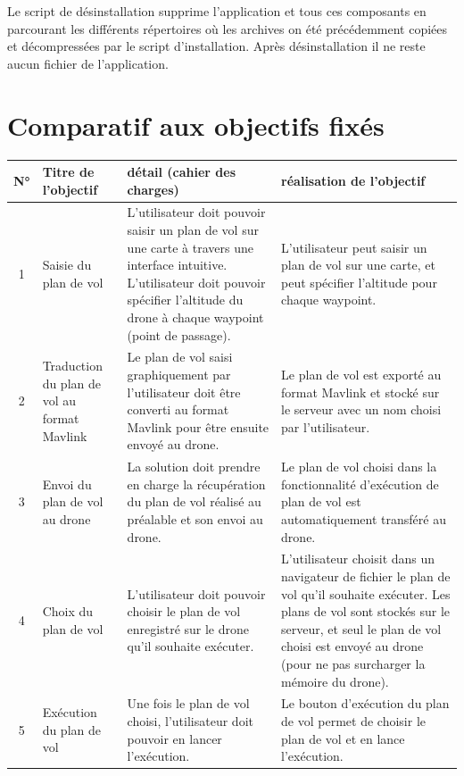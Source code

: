 \documentclass{article}
\begin{document}
Le script de désinstallation supprime l'application et tous ces composants en parcourant les différents répertoires où les archives on été précédemment copiées et décompressées par le script d'installation. Après désinstallation il ne reste aucun fichier de l'application.

\newpage
\section{Comparatif aux objectifs fixés}

\begin{center}
	    \vspace*{0.7cm}
        \begin{tabularx}{15cm}{|c|p{3cm}|p{5cm}||X|}
            \hline
            N° & Titre de l'objectif & détail (cahier des charges) & réalisation de l'objectif\\
            \hline
            1 & Saisie du plan de vol & L'utilisateur doit pouvoir saisir un plan de vol sur une carte à travers une interface intuitive. L'utilisateur doit pouvoir spécifier l'altitude du drone à chaque waypoint (point de passage).& L'utilisateur peut saisir un plan de vol sur une carte, et peut spécifier l'altitude pour chaque waypoint.\\
            \hline
            2 & Traduction du plan de vol au format Mavlink & Le plan de vol saisi graphiquement par l'utilisateur doit être converti au format Mavlink pour être ensuite envoyé au drone.& Le plan de vol est exporté au format Mavlink et stocké sur le serveur avec un nom choisi par l'utilisateur.\\
            \hline
            3 & Envoi du plan de vol au drone & La solution doit prendre en charge la récupération du plan de vol réalisé au préalable et son envoi au drone. & Le plan de vol choisi dans la fonctionnalité d'exécution de plan de vol est automatiquement transféré au drone.\\
            \hline
            4 & Choix du plan de vol  & L'utilisateur doit pouvoir choisir le plan de vol enregistré sur le drone qu'il souhaite exécuter. & L'utilisateur choisit dans un navigateur de fichier le plan de vol qu'il souhaite exécuter. Les plans de vol sont stockés sur le serveur, et seul le plan de vol choisi est envoyé au drone (pour ne pas surcharger la mémoire du drone). \\
            \hline
            5 & Exécution du plan de vol  & Une fois le plan de vol choisi, l'utilisateur doit pouvoir en lancer l'exécution. & Le bouton d'exécution du plan de vol permet de choisir le plan de vol et en lance l'exécution.\\

\end{tabularx}
\end{center}
\end{document}
